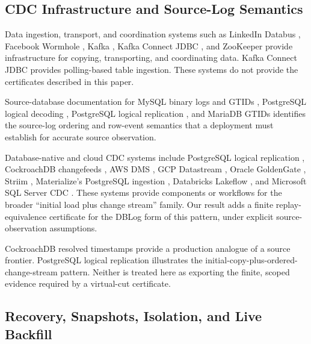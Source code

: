 \documentclass[letterpaper,10pt,twocolumn]{article}
\begin{document}
\subsection{CDC Infrastructure and Source-Log
Semantics}\label{cdc-infrastructure-and-source-log-semantics}

Data ingestion, transport, and coordination systems such as LinkedIn Databus
\citep{databus}, Facebook Wormhole \citep{wormhole}, Kafka
\citep{kafka}, Kafka Connect JDBC \citep{kafka_connect_jdbc}, and
ZooKeeper \citep{zookeeper} provide infrastructure for copying,
transporting, and coordinating data. Kafka Connect JDBC provides
polling-based table ingestion. These systems do not provide the
certificates described in this paper.

Source-database documentation for MySQL binary logs and GTIDs
\citep{mysql_binlog}, PostgreSQL logical decoding
\citep{postgres_logical_decoding}, PostgreSQL logical replication
\citep{postgres_logical_replication}, and MariaDB GTIDs
\citep{mariadb_binlog} identifies the source-log ordering and row-event
semantics that a deployment must establish for accurate source
observation.

Database-native and cloud CDC systems include PostgreSQL logical replication
\citep{postgres_logical_replication}, CockroachDB changefeeds
\citep{cockroachdb_changefeeds}, AWS DMS \citep{aws_dms}, GCP Datastream
\citep{gcp_datastream}, Oracle GoldenGate \citep{oracle_goldengate},
Striim \citep{striim}, Materialize's PostgreSQL ingestion
\citep{materialize_postgres}, Databricks Lakeflow
\citep{databricks_lakeflow}, and Microsoft SQL Server CDC
\citep{microsoft_sqlserver_cdc}. These systems provide components or
workflows for the broader ``initial load plus change stream'' family. Our result adds a finite
replay-equivalence certificate for the DBLog form of this pattern,
under explicit source-observation assumptions.

CockroachDB resolved timestamps provide a production analogue of a
source frontier. PostgreSQL logical replication illustrates the
initial-copy-plus-ordered-change-stream pattern. Neither is treated here
as exporting the finite, scoped evidence required by a virtual-cut
certificate.

\subsection{Recovery, Snapshots, Isolation, and Live
Backfill}\label{recovery-snapshots-isolation-and-live-backfill}
\end{document}
